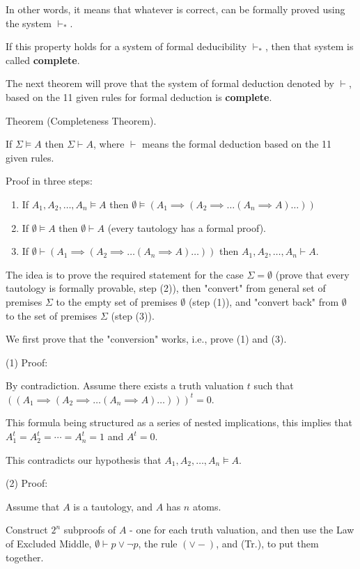 \documentclass{article}
\begin{document}
In other words, it means that whatever is correct, can be formally proved using the system $\vdash_*$. 

If this property holds for a system of formal deducibility $\vdash_*$, then that system is called \textbf{complete}. 

The next theorem will prove that the system of formal deduction denoted by $\vdash$, based on the 11 given rules for formal deduction is \textbf{complete}. 

Theorem (Completeness Theorem).

If $\Sigma \vDash A$ then $\Sigma \vdash A$, where $\vdash$ means the formal deduction based on the 11 given rules. 

Proof in three steps:
\begin{enumerate}
    \item If $A_1, A_2, \ldots, A_n \vDash A$ then $\emptyset \vDash (A_1 \implies (A_2 \implies \ldots (A_n \implies A)\ldots))$ 
    \item If $\emptyset \vDash A$ then $\emptyset \vdash A$ (every tautology has a formal proof). 
    \item If $\emptyset \vdash (A_1 \implies (A_2 \implies \ldots (A_n \implies A)\ldots ))$ then $A_1, A_2, \ldots, A_n \vdash A$.
\end{enumerate}

The idea is to prove the required statement for the case $\Sigma = \emptyset$ (prove that every tautology is formally provable, step (2)), then "convert" from general set of premises $\Sigma$ to the empty set of premises $\emptyset$ (step (1)), and "convert back" from $\emptyset$ to the set of premises $\Sigma$ (step (3)). 

We first prove that the "conversion" works, i.e., prove (1) and (3). 

(1) Proof:

By contradiction. Assume there exists a truth valuation $t$ such that $((A_1 \implies (A_2 \implies \ldots (A_n \implies A) \ldots )))^t = 0$.

This formula being structured as a series of nested implications, this implies that $A_1^t = A_2^t = \cdots = A_n^t = 1$ and $A^t = 0$.

This contradicts our hypothesis that $A_1, A_2, \ldots, A_n \vDash A$.

(2) Proof:

Assume that $A$ is a tautology, and $A$ has $n$ atoms. 

Construct $2^n$ subproofs of $A$ - one for each truth valuation, and then use the Law of Excluded Middle, $\emptyset \vdash p \vee \neg p$, the rule $(\vee -)$, and (Tr.), to put them together. 
\end{document}
